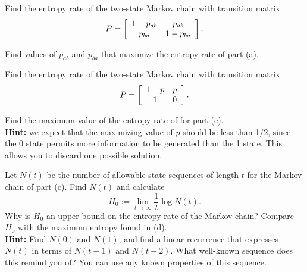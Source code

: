 \documentclass[a4paper,10pt,landscape,twocolumn]{scrartcl}
\begin{document}
\begin{exercise}
	\begin{subex}[(2pt)]
	Find the entropy rate of the two-state Markov chain with transition matrix
	\[
	P = \left[
	\begin{array}{c c}
	1-p_{ab} & p_{ab}\\
	p_{ba} & 1 - p_{ba}
	\end{array}
	\right].
	\]
	\end{subex}
	\begin{subex}[(1pt)]
	Find values of $p_{ab}$ and $p_{ba}$ that maximize the entropy rate of part (a).
	\end{subex}
	\begin{subex}[(1pt)]
	Find the entropy rate of the two-state Markov chain with transition matrix
	\[
	P = \left[
	\begin{array}{c c}
	1-p & p\\
	1 & 0
	\end{array}
	\right].
	\]
	\end{subex}
	\begin{subex}[(2pt)]
	Find the maximum value of the entropy rate of for part (c). \\\textbf{Hint:} we expect that the maximizing value of $p$ should be less than 1/2, since the 0 state permits more information to be generated than the 1 state. This allows you to discard one possible solution.
	\end{subex}
	\begin{subex}[(4pt)]
	Let $N(t)$ be the number of allowable state sequences of length $t$ for the Markov chain of part (c). Find $N(t)$ and calculate
	\[
	H_0 := \lim_{t \to \infty} \frac{1}{t} \log N(t).
	\]
	Why is $H_0$ an upper bound on the entropy rate of the Markov chain? Compare $H_0$ with the maximum entropy found in (d).
	\\\textbf{Hint:} Find $N(0)$ and $N(1)$, and find a linear \href{https://en.wikipedia.org/wiki/Recurrence_relation}{recurrence} that expresses $N(t)$ in terms of $N(t-1)$ and $N(t-2)$. What well-known sequence does this remind you of? You can use any known properties of this sequence.
	\end{subex}
\end{exercise}
\end{document}
